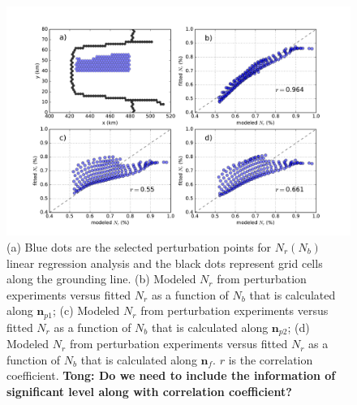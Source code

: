 \documentclass[tc, manuscript]{copernicus}
\begin{document}

\begin{figure}
\centering
\includegraphics[width=0.8\linewidth]{./figs/mismip_Nb_GLF_regression.pdf}
    \caption{(a) Blue dots are the selected perturbation points for $N_r\left(N_b\right)$ linear regression analysis and the black dots represent grid cells along the grounding line. (b) Modeled $N_r$ from perturbation experiments versus fitted $N_r$ as a function of $N_b$ that is calculated along $\textbf{n}_{p1}$; (c) Modeled $N_r$ from perturbation experiments versus fitted $N_r$ as a function of $N_b$ that is calculated along $\textbf{n}_{p2}$; (d) Modeled $N_r$ from perturbation experiments versus fitted $N_r$ as a function of $N_b$ that is calculated along $\textbf{n}_{f}$. $r$ is the correlation coefficient. \textbf{Tong: Do we need to include the information of significant level along with correlation coefficient?}}
\label{mismip_Nb_GLF_regression}
\end{figure}
\end{document}
